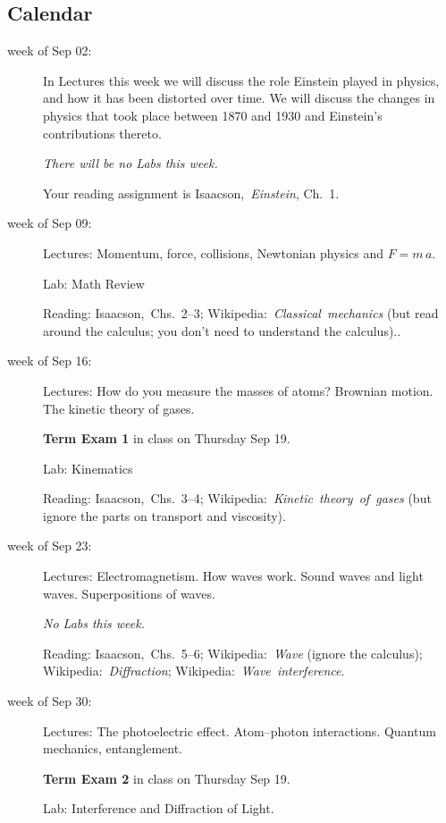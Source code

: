 \documentclass[12pt]{article}
\begin{document}
\subsection*{Calendar}\raggedright
\begin{description}
\item[week of Sep 02:] In Lectures this week we will discuss the role
  Einstein played in physics, and how it has been distorted over
  time. We will discuss the changes in physics that took place between
  1870 and 1930 and Einstein's contributions thereto.

  \textsl{There will be no Labs this week.}

  Your reading assignment is
  Isaacson,~\textit{Einstein}, Ch.~1.

\item[week of Sep 09:] Lectures: Momentum, force, collisions,
  Newtonian physics and $F=m\,a$.

  Lab: Math Review

  Reading: Isaacson,~Chs.~2--3;
  Wikipedia:~\textit{Classical~mechanics} (but read around the
  calculus; you don't need to understand the calculus)..

\item[week of Sep 16:] Lectures: How do you measure the masses of
  atoms? Brownian motion. The kinetic theory of gases.

  \textbf{Term Exam 1} in class on Thursday Sep 19.

  Lab: Kinematics

  Reading: Isaacson,~Chs.~3--4;
  Wikipedia:~\textit{Kinetic~theory~of~gases} (but ignore the parts on
  transport and viscosity).

\item[week of Sep 23:] Lectures: Electromagnetism. How waves
  work. Sound waves and light waves. Superpositions of waves.

  \textsl{No Labs this week.}

  Reading:
  Isaacson,~Chs.~5--6;
  Wikipedia:~\textit{Wave} (ignore the calculus);
  Wikipedia:~\textit{Diffraction};
  Wikipedia:~\textit{Wave~interference}.

\item[week of Sep 30:] Lectures: The photoelectric effect.
  Atom--photon interactions. Quantum mechanics, entanglement.

  \textbf{Term Exam 2} in class on Thursday Sep 19.

  Lab: Interference and Diffraction of Light.


\end{description}
\end{document}
